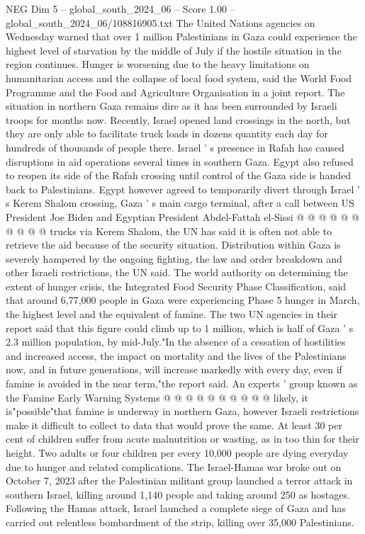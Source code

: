\begin{textsample}{NEG Dim 5 – global\_south\_2024\_06 – Score 1.00 – global\_south\_2024\_06/108816905.txt}  \label{ex:f5_neg_239}
The United Nations agencies on Wednesday warned that over 1 million Palestinians in Gaza could experience the highest level of starvation by the middle of July if the hostile situation in the region continues.
Hunger is worsening due to the heavy limitations on humanitarian access and the collapse of local food system, said the World Food Programme and the Food and Agriculture Organisation in a joint report.
The situation in northern Gaza remains dire as it has been surrounded by Israeli troops for months now.
Recently, Israel opened land crossings in the north, but they are only able to facilitate truck loads in dozens quantity each day for hundreds of thousands of people there.
Israel ' s presence in Rafah has caused disruptions in aid operations several times in southern Gaza.
Egypt also refused to reopen its side of the Rafah crossing until control of the Gaza side is handed back to Palestinians.
Egypt however agreed to temporarily divert through Israel ' s Kerem Shalom crossing, Gaza ' s main cargo terminal, after a call between US President Joe Biden and Egyptian President Abdel-Fattah el-Sissi @ @ @ @ @ @ @ @ @ @ trucks via Kerem Shalom, the UN has said it is often not able to retrieve the aid because of the security situation.
Distribution within Gaza is severely hampered by the ongoing fighting, the law and order breakdown and other Israeli restrictions, the UN said.
The world authority on determining the extent of hunger crisis, the Integrated Food Security Phase Classification, said that around 6,77,000 people in Gaza were experiencing Phase 5 hunger in March, the highest level and the equivalent of famine.
The two UN agencies in their report said that this figure could climb up to 1 million, which is half of Gaza ' s 2.3 million population, by mid-July."In the absence of a cessation of hostilities and increased access, the impact on mortality and the lives of the Palestinians now, and in future generations, will increase markedly with every day, even if famine is avoided in the near term,"the report said.
An experts ' group known as the Famine Early Warning Systems @ @ @ @ @ @ @ @ @ @ likely, it is"possible"that famine is underway in northern Gaza, however Israeli restrictions make it difficult to collect to data that would prove the same.
At least 30 per cent of children suffer from acute malnutrition or wasting, as in too thin for their height.
Two adults or four children per every 10,000 people are dying everyday due to hunger and related complications.
The Israel-Hamas war broke out on October 7, 2023 after the Palestinian militant group launched a terror attack in southern Israel, killing around 1,140 people and taking around 250 as hostages.
Following the Hamas attack, Israel launched a complete siege of Gaza and has carried out relentless bombardment of the strip, killing over 35,000 Palestinians.

\end{textsample}
